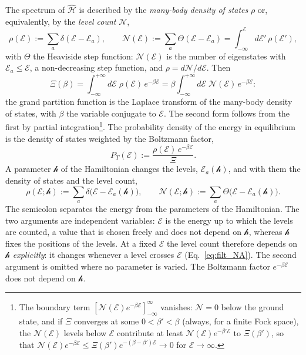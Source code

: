 \documentclass[10pt,a4paper]{article}
\theoremstyle{plain}
\newcommand{\cN}{\mathcal{N}}   %
\newcommand{\hfield}{\mathscr{h}}  %
\newcommand{\enrg}{\mathcal{E}}  %
\begin{document}
The spectrum of $\hat{\mathcal H}$ is described by the \emph{many-body
density of states} $\rho$ or, equivalently, by the \emph{level count} $\cN$,
\begin{equation}\label{eq:filt_gN}
  \rho(\enrg) := \sum_a\delta(\enrg - \enrg_a) , \qquad
  \cN(\enrg) := \sum_a\Theta(\enrg-\enrg_a) = \int_{-\infty}^{\enrg}d\enrg'\,\rho(\enrg') ,
\end{equation}
with $\Theta$ the Heaviside step function: $\cN(\enrg)$ is the number of
eigenstates with $\enrg_a\le\enrg$, a non-decreasing step function, and
$\rho=d\cN/d\enrg$. Then
\begin{equation}\label{eq:filt_laplace}
  \Xi(\beta) = \int_{-\infty}^{+\infty} d\enrg\; \rho(\enrg)\,e^{-\beta \enrg}
  = \beta\int_{-\infty}^{+\infty} d\enrg\;\cN(\enrg)\,e^{-\beta\enrg} :
\end{equation}
the grand partition function is the Laplace transform of the many-body
density of states, with $\beta$ the variable conjugate to $\enrg$. The second
form follows from the first by partial integration\footnote{The boundary
term $[\cN(\enrg)e^{-\beta\enrg}]_{-\infty}^{\infty}$ vanishes: $\cN=0$ below
the ground state, and if $\Xi$ converges at some $0<\beta'<\beta$ (always,
for a finite Fock space), the $\cN(\enrg)$ levels below $\enrg$ contribute at
least $\cN(\enrg)e^{-\beta'\enrg}$ to $\Xi(\beta')$, so that
$\cN(\enrg)e^{-\beta\enrg}\le\Xi(\beta')e^{-(\beta-\beta')\enrg}\to0$ for
$\enrg\to\infty$.}. The probability density of the energy in equilibrium is
the density of states weighted by the Boltzmann factor,
\[
  P_T(\enrg) := \frac{\rho(\enrg)\,e^{-\beta \enrg}}{\Xi} .
\]
A parameter $\hfield$ of the Hamiltonian changes the levels,
$\enrg_a(\hfield)$, and with them the density of states and the level count,
\begin{equation}\label{eq:filt_gNh}
  \rho(\enrg;\hfield):=\sum_a\delta\big(\enrg-\enrg_a(\hfield)\big) ,
  \qquad
  \cN(\enrg;\hfield):=\sum_a\Theta\big(\enrg-\enrg_a(\hfield)\big) .
\end{equation}
The semicolon separates the energy from the parameters of the Hamiltonian.
The two arguments are independent variables: $\enrg$ is the energy up to
which the levels are counted, a value that is chosen freely and does not
depend on $\hfield$, whereas $\hfield$ fixes the positions of the levels. At
a fixed $\enrg$ the level count therefore depends on $\hfield$
\emph{explicitly}: it changes whenever a level crosses $\enrg$
(Eq.~\eqref{eq:filt_NA}). The second argument is omitted where no parameter
is varied. The Boltzmann factor $e^{-\beta\enrg}$ does not depend on
$\hfield$.
\end{document}
